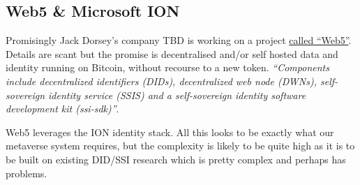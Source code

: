 \subsection{Web5 \& Microsoft ION}
Promisingly Jack Dorsey's company TBD is working on a project \href{https://developer.tbd.website/projects/web5/}{called ``Web5''}. Details are scant but the promise is decentralised and/or self hosted data and identity running on Bitcoin, without recourse to a new token. \textit{``Components include decentralized identifiers (DIDs), decentralized web node (DWNs), self-sovereign identity service (SSIS) and a self-sovereign identity software development kit (ssi-sdk)''}.\par
Web5 leverages the ION identity stack. All this looks to be exactly what our metaverse system requires, but the complexity is likely to be quite high as it is to be built on existing DID/SSI research which is pretty complex and perhaps has problems.
